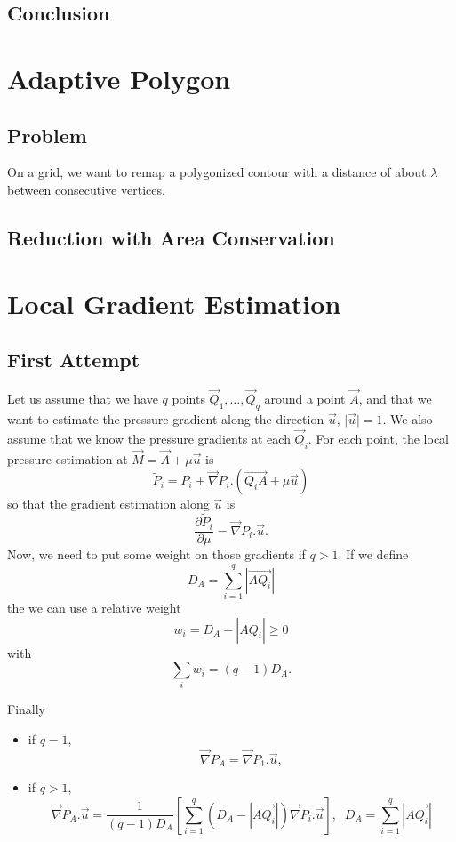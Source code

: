 \documentclass[aps]{revtex4}
\newcommand{\myvec}[1]{\overrightarrow{#1}}
\newcommand{\mygrad}{\vec{\nabla}}
\begin{document}
\subsection{Conclusion}

\section{Adaptive Polygon}

\subsection{Problem}
On a grid, we want to remap a polygonized contour with a distance of about $\lambda$ between consecutive vertices.

\subsection{Reduction with Area Conservation}


\section{Local Gradient Estimation}

\subsection{First Attempt}

Let us assume that we have $q$ points $\vec{Q}_1,\ldots,\vec{Q}_{q}$ around a point $\vec{A}$, and that we want to
estimate the pressure gradient along the direction $\vec{u}$, $\vert\vec{u}\vert=1$. 
We also assume that we know the pressure gradients at each $\vec{Q}_i$.
For each point, the local pressure estimation at $\vec{M} = \vec{A} + \mu \vec{u}$ is
$$
	\tilde{P}_i = P_i + \mygrad P_i . \left(\myvec{Q_iA} +\mu \vec{u}\right)
$$
so that the gradient estimation along $\vec{u}$ is
$$
	\dfrac{\partial \tilde{P}_i}{\partial \mu} = \mygrad P_i.\vec{u}.
$$
Now, we need to put some weight on those gradients if $q>1$.
If we define
$$
	D_A =  \sum_{i=1}^q \left\vert \myvec{AQ_i}\right\vert
$$
the we can use a relative weight
$$
	w_i = D_A - \left\vert \myvec{AQ_i}\right\vert \geq 0
$$
with
$$
	\sum_i w_i = (q-1) D_A.
$$

Finally
\begin{itemize}
\item if $q=1$,
	$$
		\mygrad P_A = \mygrad P_1.\vec{u},
	$$
\item if $q>1$,
$$
	\mygrad P_A.\vec{u} = \dfrac{1}{\left(q-1\right)D_A} \left\lbrack \sum_{i=1}^q \left(D_A - \left\vert \myvec{AQ_i}\right\vert\right) \mygrad P_i.\vec{u} \right\rbrack, \;\; D_A =  \sum_{i=1}^q \left\vert \myvec{AQ_i}\right\vert
$$
\end{itemize}
\end{document}
